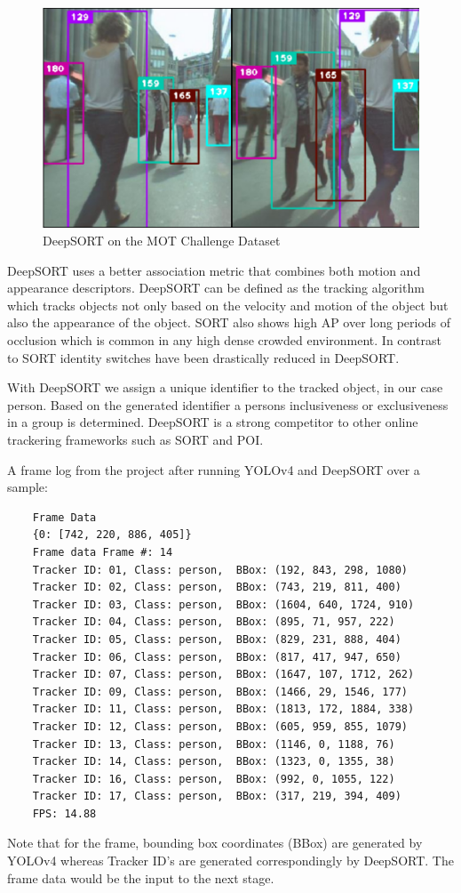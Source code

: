 \documentclass{fisatprojectfinal}
\begin{document}
\begin{figure}[h!]
\begin{center}
\includegraphics[scale=.8]{img_deepsort.eps}
\caption{DeepSORT on the MOT Challenge Dataset}
\end{center}
\end{figure}

DeepSORT uses a better association metric that combines both motion and appearance descriptors. DeepSORT can be defined as the tracking algorithm which tracks objects not only based on the velocity and motion of the object but also the appearance of the object. SORT also shows high AP over long periods of occlusion which is common in any high dense crowded environment. In contrast to SORT identity switches have been drastically reduced in DeepSORT. 

With DeepSORT we assign a unique identifier to the tracked object, in our case person. Based on the generated identifier a persons inclusiveness or exclusiveness in a group is determined. DeepSORT is a strong competitor to other online trackering frameworks such as SORT and POI.

A frame log from the project after running YOLOv4 and DeepSORT over a sample: 
\begin{verbatim}
    Frame Data
    {0: [742, 220, 886, 405]}
    Frame data Frame #: 14
    Tracker ID: 01, Class: person,  BBox: (192, 843, 298, 1080)
    Tracker ID: 02, Class: person,  BBox: (743, 219, 811, 400)
    Tracker ID: 03, Class: person,  BBox: (1604, 640, 1724, 910)
    Tracker ID: 04, Class: person,  BBox: (895, 71, 957, 222)
    Tracker ID: 05, Class: person,  BBox: (829, 231, 888, 404)
    Tracker ID: 06, Class: person,  BBox: (817, 417, 947, 650)
    Tracker ID: 07, Class: person,  BBox: (1647, 107, 1712, 262)
    Tracker ID: 09, Class: person,  BBox: (1466, 29, 1546, 177)
    Tracker ID: 11, Class: person,  BBox: (1813, 172, 1884, 338)
    Tracker ID: 12, Class: person,  BBox: (605, 959, 855, 1079)
    Tracker ID: 13, Class: person,  BBox: (1146, 0, 1188, 76)
    Tracker ID: 14, Class: person,  BBox: (1323, 0, 1355, 38)
    Tracker ID: 16, Class: person,  BBox: (992, 0, 1055, 122)
    Tracker ID: 17, Class: person,  BBox: (317, 219, 394, 409)
    FPS: 14.88
\end{verbatim}
Note that for the frame, bounding box coordinates (BBox) are generated by YOLOv4 whereas Tracker ID's are generated correspondingly by DeepSORT. The frame data would be the input to the next stage.
\end{document}
